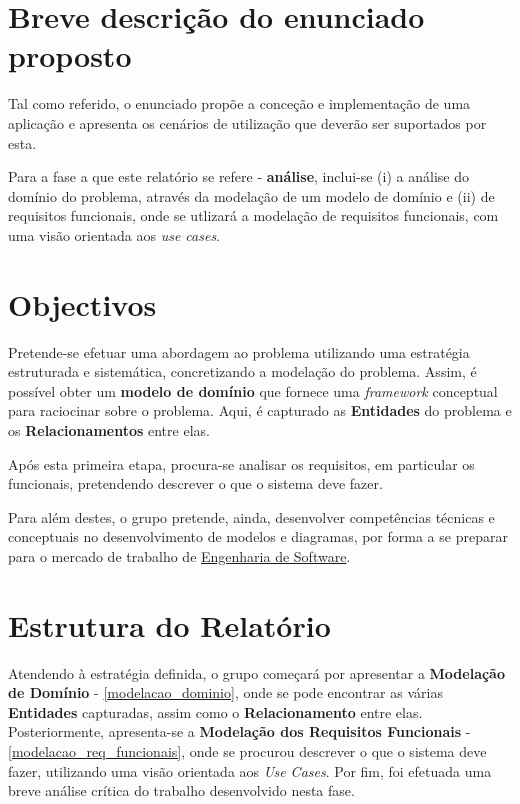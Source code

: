 \documentclass[a4paper,12pt]{scrreprt}
\begin{document}
\section{Breve descrição do enunciado proposto}

Tal como referido, o enunciado propõe a conceção e implementação de uma aplicação e apresenta os cenários de utilização que deverão ser
suportados por esta.

Para a fase a que este relatório se refere - \textbf{análise}, inclui-se 
(i) a análise do domínio do problema, através da modelação de um modelo de domínio e 
(ii) de requisitos funcionais, onde se utlizará a modelação de requisitos funcionais, com uma visão orientada aos \textit{use cases}.

\section{Objectivos}
Pretende-se efetuar uma abordagem ao problema utilizando uma estratégia estruturada e sistemática, concretizando a modelação do problema.
Assim, é possível obter um \textbf{modelo de domínio} que fornece uma \textit{framework} conceptual para raciocinar sobre o problema.
Aqui, é capturado as \textbf{Entidades} do problema e os \textbf{Relacionamentos} entre elas.

Após esta primeira etapa, procura-se analisar os requisitos, em particular os funcionais, pretendendo descrever o que o sistema deve fazer.

Para além destes, o grupo pretende, ainda, desenvolver competências técnicas e conceptuais no desenvolvimento de modelos e diagramas,
por forma a se preparar para o mercado de trabalho de \underline{Engenharia de Software}.

\section{Estrutura do Relatório}
Atendendo à estratégia definida, o grupo começará por apresentar a \textbf{Modelação de Domínio} - \ref{modelacao_dominio},
onde se pode encontrar as várias \textbf{Entidades} capturadas, assim como o \textbf{Relacionamento} entre elas.
Posteriormente, apresenta-se a \textbf{Modelação dos Requisitos Funcionais} - \ref{modelacao_req_funcionais}, 
onde se procurou descrever o que o sistema deve fazer, utilizando uma visão orientada aos \textit{Use Cases}.
Por fim, foi efetuada uma breve análise crítica do trabalho desenvolvido nesta fase.

\end{document}
